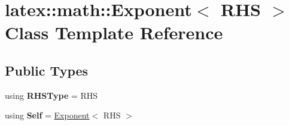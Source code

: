 \hypertarget{classlatex_1_1math_1_1Exponent}{\section{latex\-:\-:math\-:\-:Exponent$<$ R\-H\-S $>$ Class Template Reference}
\label{classlatex_1_1math_1_1Exponent}
}
\subsection*{Public Types}
\begin{DoxyCompactItemize}
\item 
\hypertarget{classlatex_1_1math_1_1Exponent_ab88660fc9cebd03743815a5f44555496}{using {\bfseries R\-H\-S\-Type} = R\-H\-S}\label{classlatex_1_1math_1_1Exponent_ab88660fc9cebd03743815a5f44555496}

\item 
\hypertarget{classlatex_1_1math_1_1Exponent_a7ed7d60d3934f7c42fc962c201fa12ae}{using {\bfseries Self} = \hyperlink{classlatex_1_1math_1_1Exponent}{Exponent}$<$ R\-H\-S $>$}\label{classlatex_1_1math_1_1Exponent_a7ed7d60d3934f7c42fc962c201fa12ae}

\end{DoxyCompactItemize}
